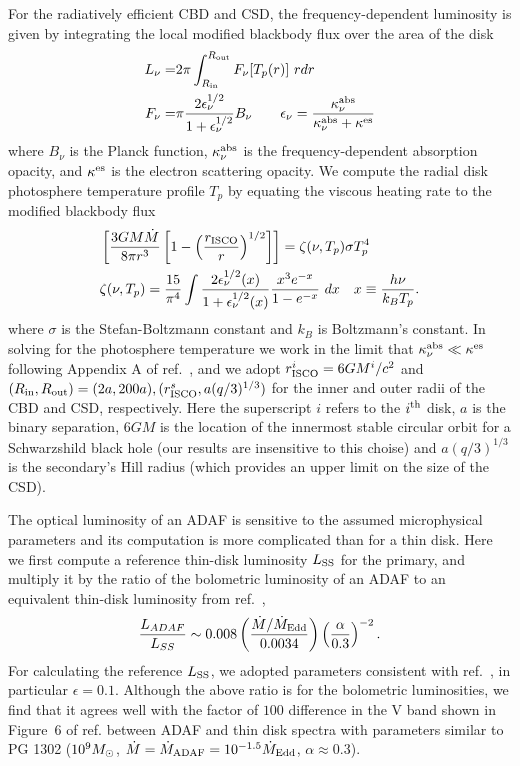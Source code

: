 For the radiatively efficient CBD and CSD, the frequency-dependent
luminosity is given by integrating the local modified blackbody flux
over the area of the disk
%
\begin{align}
L_{\nu} =& 2 \pi \int^{R_{\rm out}}_{R_{\rm in}}{F_{\nu}[T_p(r)] \ r dr} \nonumber \\
%
F_{\nu} =& \pi \frac{2 \epsilon^{1/2}_{\nu}}{1 + \epsilon^{1/2}_{\nu} } B_{\nu} \qquad \epsilon_{\nu} = \frac{  \kappa^{\rm abs}_{\nu}  }{  \kappa^{\rm abs}_{\nu} +  \kappa^{\rm es}}
\label{Eq:LandF}
\end{align}
%
where $B_{\nu}$ is the Planck function, $ \kappa^{\rm abs}_{\nu}$ is
the frequency-dependent absorption opacity, and $\kappa^{\rm es}$ is
the electron scattering opacity. We compute the radial disk
photosphere temperature profile $T_p$ by equating the viscous heating
rate to the modified blackbody flux
%
\begin{align}
\label{Eq:Tp}
& \left[ \frac{3GM\dot{M}}{8 \pi r^3 }  \left[ 1 -  \left(\frac{r_{\rm{ISCO}}}{r}\right)^{1/2}\right]  \right] = \zeta(\nu, T_p) \sigma T^4_p  \\ \nonumber
%
& \zeta(\nu, T_p) = \frac{15}{\pi^4} \int{   \frac{2 \epsilon^{1/2}_{\nu}(x)}{1 + \epsilon^{1/2}_{\nu}(x) }  \frac{x^3 e^{-x}}{1- e^{-x}}  \ dx }  \quad x \equiv \frac{h \nu}{k_B T_p}.
\end{align}
%
where $\sigma$ is the Stefan-Boltzmann constant and $k_B$ is
Boltzmann's constant. In solving for the photosphere temperature we
work in the limit that $\kappa^{\rm abs}_{\nu} \ll \kappa^{\rm es}$
following Appendix A of ref.~\cite{TanakaMenou:2010}, and we adopt
$r^i_{\rm{ISCO}}=6GM^i/c^2$ and $(R_{\rm in}, R_{\rm out}) =
(2a,200a), (r^s_{\rm{ISCO}}, a (q/3)^{1/3})$ for the inner and outer
radii of the CBD and CSD, respectively. Here the superscript $i$
refers to the $i^{\rm{th}}$ disk, $a$ is the binary separation, $6GM$
is the location of the innermost stable circular orbit for a
Schwarzshild black hole (our results are insensitive to this choise)
and $a(q/3)^{1/3}$ is the secondary's Hill radius (which provides an
upper limit on the size of the CSD\cite{AL94}).

The optical luminosity of an ADAF is sensitive to the assumed
microphysical parameters and its computation is more complicated than
for a thin disk.  Here we first compute a reference thin-disk
luminosity $L_{\rm SS}$ for the primary, and multiply it by the ratio
of the bolometric luminosity of an ADAF to an equivalent thin-disk
luminosity from ref.~\cite{Mahadevan:1997},
\begin{align}
\frac{L_{ADAF}}{L_{SS}} \sim 0.008  \left( \frac{ \dot{M} / \dot{M}_{\rm{Edd}}}{0.0034}\right)  \left( \frac{\alpha}{0.3} \right)^{-2}.
\label{Eq:LADAF}
\end{align}
For calculating the reference $L_{\rm SS}$, we adopted parameters
consistent with ref.~\cite{Mahadevan:1997}, in particular
$\epsilon=0.1$.  Although the above ratio is for the bolometric
luminosities, we find that it agrees well with the factor of $100$
difference in the V band shown in Figure~6 of
ref. \cite{NMQ:ADAF:1998} between ADAF and thin disk spectra with
parameters similar to PG 1302 ($10^9 {M_{\odot}}$, $\dot{M} =
\dot{M}_{\rm{ADAF}}=10^{-1.5} \dot{M}_{\rm{Edd}}$, $\alpha \approx
0.3$).


